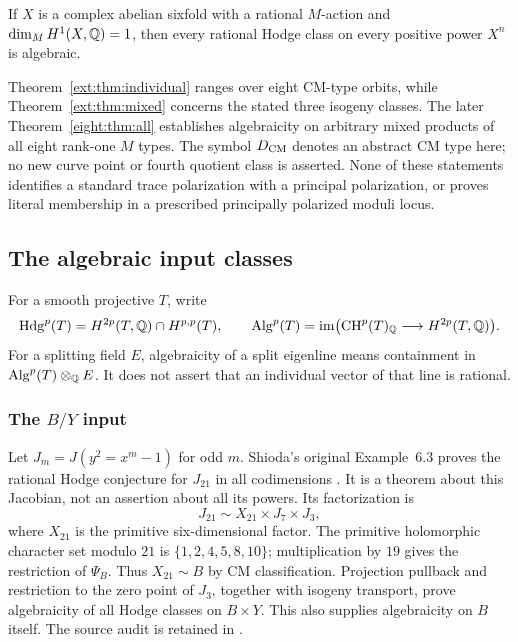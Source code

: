 \begin{theorem}\label{ext:thm:individual}
If $X$ is a complex abelian sixfold with a rational $M$-action and
$\dim_M H^1(X,\mathbb Q)=1$, then every rational Hodge class on every positive
power $X^n$ is algebraic.
\end{theorem}

Theorem~\ref{ext:thm:individual} ranges over eight CM-type orbits, while
Theorem~\ref{ext:thm:mixed} concerns the stated three isogeny classes.
The later Theorem~\ref{eight:thm:all} establishes algebraicity on arbitrary
mixed products of all eight rank-one $M$ types. The symbol $D_{\mathrm{CM}}$ denotes an abstract CM type here; no new curve
point or fourth quotient class is asserted. None of these statements
identifies a standard trace polarization with a principal polarization,
or proves literal membership in a prescribed principally polarized
moduli locus.

\subsection{The algebraic input classes}\label{ext:sec:inputs}
For a smooth projective $T$, write
\[
 \operatorname{Hdg}^p(T)=H^{2p}(T,\mathbb Q)\cap H^{p,p}(T),\qquad
 \operatorname{Alg}^p(T)=\operatorname{im}\bigl(\mathrm{CH}^p(T)_{\mathbb Q}
                   \longrightarrow H^{2p}(T,\mathbb Q)\bigr).
\]
For a splitting field $E$, algebraicity of a split eigenline means
containment in $\operatorname{Alg}^p(T)\otimes_{\mathbb Q}E$. It does not assert that an
individual vector of that line is rational.

\subsubsection{The $B/Y$ input}
Let $J_m=J(y^2=x^m-1)$ for odd $m$. Shioda's original
Example~6.3 proves the rational Hodge conjecture for $J_{21}$ in all
codimensions \cite[pp.~76--77]{Shioda1981}. It is a theorem about this
Jacobian, not an assertion about all its powers. Its factorization is
\[
 J_{21}\sim X_{21}\times J_7\times J_3,
\]
where $X_{21}$ is the primitive six-dimensional factor. The primitive
holomorphic character set modulo $21$ is $\{1,2,4,5,8,10\}$;
multiplication by $19$ gives the restriction of $\Psi_B$.
Thus $X_{21}\sim B$ by CM classification. Projection pullback and
restriction to the zero point of $J_3$, together with isogeny transport,
prove algebraicity of all Hodge classes on $B\times Y$. This also
supplies algebraicity on $B$ itself. The source audit is retained in
.

